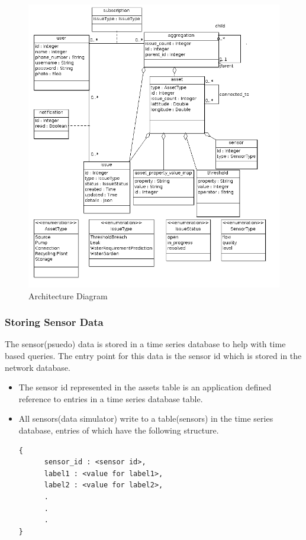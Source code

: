 \documentclass[11pt]{report} %
\begin{document}
\begin{figure}[h!]
  \caption{Architecture Diagram}
  \centering
    \includegraphics[scale=0.4]{DBDesign.png}
\end{figure}

\subsubsection{Storing Sensor Data}
The sensor(psuedo) data is stored in a time series database to help with time based queries. The entry point for this data is the sensor id which is stored in the network database.
\begin{itemize}
\item The sensor id represented in the assets table is an application defined reference to entries in a time series database table.
\item All sensors(data simulator) write to a table(sensors) in the time series database,  entries of which have the following structure.
\begin{lstlisting}
{
      sensor_id : <sensor id>,
      label1 : <value for label1>,
      label2 : <value for label2>,
      .
      .
      .
}
\end{lstlisting}
\end{itemize}
\end{document}

